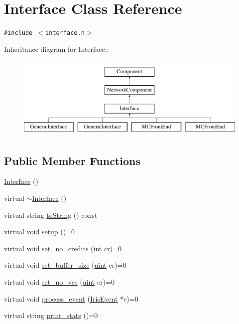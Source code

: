 \hypertarget{classInterface}{
\section{Interface Class Reference}
\label{classInterface}
}
{\tt \#include $<$interface.h$>$}

Inheritance diagram for Interface::\begin{figure}[H]
\begin{center}
\leavevmode
\includegraphics[height=4cm]{classInterface}
\end{center}
\end{figure}
\subsection*{Public Member Functions}
\begin{CompactItemize}
\item 
\hyperlink{classInterface_4406d74c75bdfe150bf72be1f1cda8b1}{Interface} ()
\item 
virtual \hyperlink{classInterface_19179888f29f18f1be54a3dfe98f68c0}{$\sim$Interface} ()
\item 
virtual string \hyperlink{classInterface_137cdb3bca46eb2ae0bbf017d1efb66e}{toString} () const 
\item 
virtual void \hyperlink{classInterface_f9015204e6dabe3e0fce572b19cd1550}{setup} ()=0
\item 
virtual void \hyperlink{classInterface_c458ee6d8e974cb0a9f90308d0feb16d}{set\_\-no\_\-credits} (int cr)=0
\item 
virtual void \hyperlink{classInterface_f2cec7f7aa725d52c8bb02087d7c9e5d}{set\_\-buffer\_\-size} (\hyperlink{outputBuffer_8h_91ad9478d81a7aaf2593e8d9c3d06a14}{uint} cr)=0
\item 
virtual void \hyperlink{classInterface_e7266de6cc9e1dfd4bb3a1b8face3c15}{set\_\-no\_\-vcs} (\hyperlink{outputBuffer_8h_91ad9478d81a7aaf2593e8d9c3d06a14}{uint} cr)=0
\item 
virtual void \hyperlink{classInterface_baaaeb823b1e0fd7ddc1bb32c2f016fb}{process\_\-event} (\hyperlink{classIrisEvent}{IrisEvent} $\ast$e)=0
\item 
virtual string \hyperlink{classInterface_abfe4b675df488fd5a88d2876cff0ebe}{print\_\-stats} ()=0
\end{CompactItemize}
